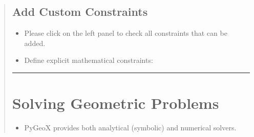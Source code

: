 \documentclass[letterpaper,10pt,english]{sphinxmanual}
\begin{document}
\begin{quote}
\begin{itemize}
\end{itemize}

\begin{sphinxVerbatim}[commandchars=\\\{\}]
\end{sphinxVerbatim}


\section{Add Custom Constraints}
\label{\detokenize{index:add-custom-constraints}}\begin{itemize}
\item {} 
\sphinxAtStartPar
Please click  on the left panel to check all constraints that can be added.

\item {} 
\sphinxAtStartPar
Define explicit mathematical constraints:

\end{itemize}

\begin{sphinxVerbatim}[commandchars=\\\{\}]
 
   
 
\end{sphinxVerbatim}


\bigskip\hrule\bigskip



\chapter{Solving Geometric Problems}
\label{\detokenize{index:solving-geometric-problems}}\begin{itemize}
\item {} 
\sphinxAtStartPar
PyGeoX provides both analytical (symbolic) and numerical solvers.

\end{itemize}


\end{quote}
\end{document}
